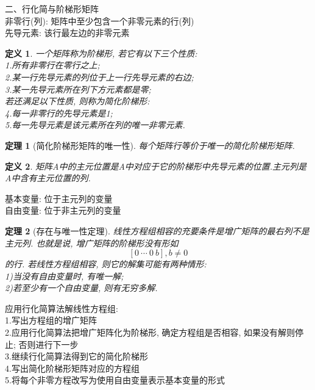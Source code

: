 \documentclass[UTF8,fontset=ubuntu]{ctexart}
\theoremstyle{nonumberplain}
\newtheorem{definition}{定义}
\theoremstyle{break}
\newtheorem{theorem}{定理}
\theoremstyle{empty}
\begin{document}
二、行化简与阶梯形矩阵\\[1ex]
非零行(列): 矩阵中至少包含一个非零元素的行(列)\\
先导元素: 该行最左边的非零元素\\
\begin{definition}
一个矩阵称为阶梯形, 若它有以下三个性质:\\
1.所有非零行在零行之上;\\
2.某一行先导元素的列位于上一行先导元素的右边;\\
3.某一先导元素所在列下方元素都是零;\\
若还满足以下性质, 则称为简化阶梯形:\\
4.每一非零行的先导元素是1;\\
5.每一先导元素是该元素所在列的唯一非零元素.
\end{definition}\vspace{2ex}

\begin{theorem}[简化阶梯形矩阵的唯一性]
每个矩阵行等价于唯一的简化阶梯形矩阵.
\end{theorem}\vspace{2ex}

\begin{definition}
矩阵A中的{\heiti 主元位置}是A中对应于它的阶梯形中先导元素的位置.{\heiti 主元列}是A中含有主元位置的列.
\end{definition}\vspace{2ex}

基本变量: 位于主元列的变量\\
自由变量: 位于非主元列的变量\\[2ex]

\begin{theorem}[存在与唯一性定理]
线性方程组相容的充要条件是增广矩阵的最右列不是主元列. 也就是说, 增广矩阵的阶梯形没有形如
	\[[0\ \cdots\ 0\ b], b\neq 0\]
的行. 若线性方程组相容, 则它的解集可能有两种情形:\\
1)当没有自由变量时, 有唯一解;\\
2)若至少有一个自由变量, 则有无穷多解.
\end{theorem}\vspace{2ex}

应用行化简算法解线性方程组:\\
1.写出方程组的增广矩阵\\
2.应用行化简算法把增广矩阵化为阶梯形, 确定方程组是否相容, 如果没有解则停止; 否则进行下一步\\
3.继续行化简算法得到它的简化阶梯形\\
4.写出简化阶梯形矩阵对应的方程组\\
5.将每个非零方程改写为使用自由变量表示基本变量的形式\\[4ex]
\end{document}
